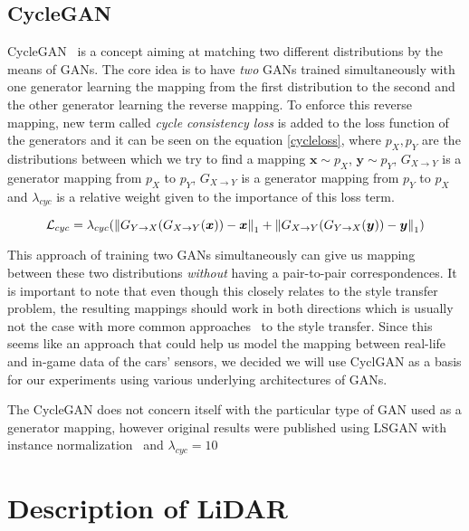 \subsection{CycleGAN} \label{cyclegan}

CycleGAN~\cite{cyclegan} is a concept aiming at matching two different distributions by the means of GANs. The core idea is to have {\em two} GANs trained simultaneously with one generator learning the mapping from the first distribution to the second and the other generator learning the reverse mapping. To enforce this reverse mapping, new term called {\em cycle consistency loss} is added to the loss function of the generators and it can be seen on the equation \ref{cycleloss}, where $p_X, p_Y$ are the distributions between which we try to find a mapping $\bm{x}\sim p_X$, $\bm{y}\sim p_Y$, $G_{X\rightarrow Y}$ is a generator mapping from $p_X$ to $p_Y$, $G_{X\rightarrow Y}$ is a generator mapping from $p_Y$ to $p_X$ and $\lambda_{cyc}$ is a relative weight given to the importance of this loss term.

\begin{equation}
\mathcal{L}_{cyc} = \lambda_{cyc}(\left\lVert G_{Y\rightarrow X}(G_{X\rightarrow Y}(\bm{x})) - \bm{x}\right\rVert_1 + \left\lVert G_{X\rightarrow Y}(G_{Y\rightarrow X}(\bm{y})) - \bm{y}\right\rVert_1)
\label{cycleloss}
\end{equation}

This approach of training two GANs simultaneously can give us mapping between these two distributions {\em without} having a pair-to-pair correspondences. It is important to note that even though this closely relates to the style transfer problem, the resulting mappings should work in both directions which is usually not the case with more common approaches~\cite{artstyle} to the style transfer. Since this seems like an approach that could help us model the mapping between real-life and in-game data of the cars' sensors, we decided we will use CyclGAN as a basis for our experiments using various underlying architectures of GANs.

The CycleGAN does not concern itself with the particular type of GAN used as a generator mapping, however original results were published using LSGAN with instance normalization~\cite{instancenorm} and $\lambda_{cyc} = 10$

\section{Description of LiDAR}
